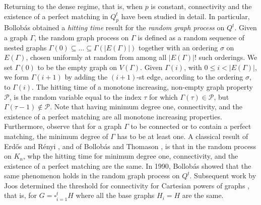 \documentclass[10pt,a4paper]{article}
\newtheorem{thm}{Theorem}[section]
\begin{document}
Returning to the dense regime, that is, when $p$ is constant, connectivity and the existence of a perfect matching in $Q^t_p$ have been studied in detail. In particular, Bollob\'as \cite{B90} obtained a \textit{hitting time} result for the \textit{random graph process} on $Q^t$. Given a graph $\Gamma$, the random graph process on $\Gamma$ is defined as a random sequence of nested graphs $\Gamma(0)\subseteq \ldots \subseteq \Gamma(|E(\Gamma)|)$ together with an ordering $\sigma$ on $E(\Gamma)$, chosen uniformly at random from among all $|E(\Gamma)|!$ such orderings. We set $\Gamma(0)$ to be the empty graph on $V(\Gamma)$. Given $\Gamma(i)$, with $0\le i < |E(\Gamma)|$, we form $\Gamma(i+1)$ by adding the $(i+1)$-st edge, according to the ordering $\sigma$, to $\Gamma(i)$. The hitting time of a monotone increasing, non-empty graph property $\mathcal{P}$, is the random variable equal to the index $\tau$ for which $\Gamma(\tau)\in \mathcal{P}$, but $\Gamma(\tau-1)\notin\mathcal{P}$. Note that having minimum degree one, connectivity, and the existence of a perfect matching are all monotone increasing properties. Furthermore, observe that for a graph $\Gamma$ to be connected or to contain a perfect matching, the minimum degree of $\Gamma$ has to be at least one. A classical result of Erd\H{o}s and R\'enyi \cite{ER66}, and of Bollob\'as and Thomason \cite{BT85}, is that in the random process on $K_n$, whp the hitting time for minimum degree one, connectivity, and the existence of a perfect matching are the same. In 1990, Bollob\'as \cite{B90} showed that the same phenomenon holds in the random graph process on $Q^t$.
Subsequent work by Joos determined the threshold for connectivity for Cartesian powers of graphs \cite{J12, J15}, that is, for $G=\square_{i=1}^tH$ where all the base graphs $H_i=H$ are the same.


\end{document}
